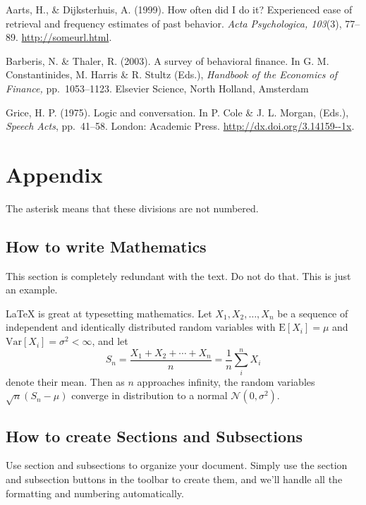 \documentclass[twocolumn]{article}
\begin{document}
\begin{hangparas}{1em}{1}

  Aarts, H., \& Dijksterhuis, A. (1999).  How often did I do it?
  Experienced ease of retrieval and frequency estimates of past
  behavior.  \textit{Acta Psychologica, 103}(3), 77--89. \url{http://someurl.html}.

  Barberis, N. \& Thaler, R. (2003). A survey of behavioral finance.
  In G. M. Constantinides, M. Harris \& R. Stultz (Eds.),
  \textit{Handbook of the Economics of Finance,} pp.\ 1053--1123.
  Elsevier Science, North Holland, Amsterdam

\vfill %
\break

Grice, H. P. (1975).  Logic and conversation. In P. Cole \& J.
L. Morgan, (Eds.), \textit{Speech Acts}, pp.\ 41--58. London: Academic
Press. \url{http://dx.doi.org/3.14159--1x}.
\end{hangparas}

\bigskip
\section*{Appendix}

The asterisk means that these divisions are not numbered.

\subsection*{How to write Mathematics}

This section is completely redundant with the text. Do not do
that. This is just an example.

\LaTeX{} is great at typesetting mathematics. Let $X_1, X_2, \ldots, X_n$ be a sequence of independent and identically distributed random variables with $\text{E}[X_i] = \mu$ and $\text{Var}[X_i] = \sigma^2 < \infty$, and let
\[S_n = \frac{X_1 + X_2 + \cdots + X_n}{n}
      = \frac{1}{n}\sum_{i}^{n} X_i\]
denote their mean. Then as $n$ approaches infinity, the random variables $\sqrt{n}(S_n - \mu)$ converge in distribution to a normal $\mathcal{N}(0, \sigma^2)$.


\subsection*{How to create Sections and Subsections}

Use section and subsections to organize your document. Simply use the section and subsection buttons in the toolbar to create them, and we'll handle all the formatting and numbering automatically.
\end{document}
